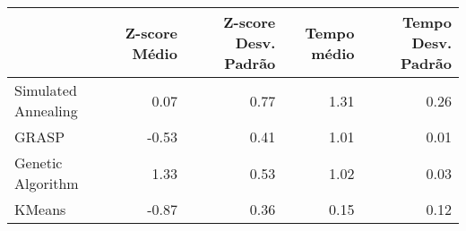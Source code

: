 \begin{table}
\centering
\label{tab:test_status}
\begin{tabular}{lrrrr}
\toprule
{} &  Z-score Médio &  Z-score Desv. Padrão &  Tempo médio &  Tempo Desv. Padrão \\
\midrule
Simulated Annealing &           0.07 &                  0.77 &         1.31 &                0.26 \\
GRASP               &          -0.53 &                  0.41 &         1.01 &                0.01 \\
Genetic Algorithm   &           1.33 &                  0.53 &         1.02 &                0.03 \\
KMeans              &          -0.87 &                  0.36 &         0.15 &                0.12 \\
\bottomrule
\end{tabular}
\end{table}

